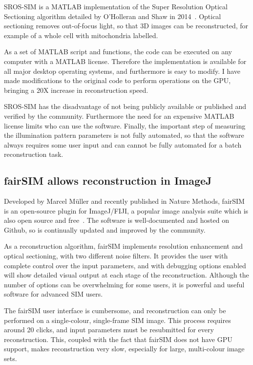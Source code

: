 SROS-SIM is a MATLAB implementation of the Super Resolution Optical Sectioning algorithm detailed by O'Holleran and Shaw in 2014~\cite{oholleran2014optimized}. 
Optical sectioning removes out-of-focus light, so that 3D images can be reconstructed, for example of a whole cell with mitochondria labelled.

As a set of MATLAB script and functions, the code can be executed on any computer with a MATLAB license.
Therefore the implementation is available for all major desktop operating systems, and furthermore is easy to modify.
I have made modifications to the original code to perform operations on the GPU, bringing a 20X increase in reconstruction speed. 

SROS-SIM has the disadvantage of not being publicly available or published and verified by the community.
Furthermore the need for an expensive MATLAB license limits who can use the software. 
Finally, the important step of measuring the illumination pattern parameters is not fully automated, so that the software always requires some user input and can cannot be fully automated for a batch reconstruction task.

\subsection{fairSIM allows reconstruction in ImageJ}
Developed by Marcel M\"uller and recently published in Nature Methods, fairSIM is an open-source plugin for ImageJ/FIJI, a popular image analysis suite which is also open source and free~\cite{muller2016open}. 
The software is well-documented and hosted on Github, so is continually updated and improved by the community. 

As a reconstruction algorithm, fairSIM implements resolution enhancement and optical sectioning, with two different noise filters. 
It provides the user with complete control over the input parameters, and with debugging options enabled will show detailed visual output at each stage of the reconstruction. 
Although the number of options can be overwhelming for some users, it is powerful and useful software for advanced SIM users. 

The fairSIM user interface is cumbersome, and reconstruction can only be performed on a single-colour, single-frame SIM image. 
This process requires around 20 clicks, and input parameters must be resubmitted for every reconstruction. 
This, coupled with the fact that fairSIM does not have GPU support, makes reconstruction very slow, especially for large, multi-colour image sets. 

